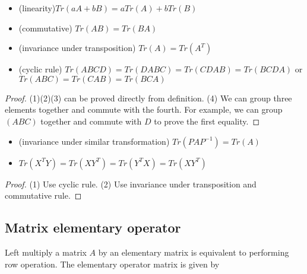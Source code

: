 \begin{refsection}
\begin{lemma}\label{appendix:th:matrixtraceproperty}\hfill
	\begin{itemize}
		\item (linearity)$Tr(aA + bB) = aTr(A) + bTr(B)$
		\item (commutative) $Tr(AB) = Tr(BA)$
		\item (invariance under transposition) $Tr(A) = Tr(A^T)$		
		\item (cyclic rule) $Tr(ABCD) = Tr(DABC)  = Tr(CDAB)= Tr(BCDA) $ or
		$Tr(ABC) = Tr(CAB) = Tr(BCA)$
	\end{itemize}
\end{lemma}
\begin{proof}
(1)(2)(3) can be proved directly from definition. (4) We can group three elements together and commute with the fourth. For example, we can group $(ABC)$ together and commute with $D$ to prove the first equality.
\end{proof}

\begin{corollary}\hfill
		\begin{itemize}
			\item (invariance under similar transformation) $Tr(PAP^{-1}) = Tr(A)$
			\item $Tr(X^TY)=Tr(XY^T) = Tr(Y^TX) = Tr(XY^T)$
		\end{itemize}
\end{corollary}
\begin{proof}
(1) Use cyclic rule. (2) Use invariance under transposition and commutative rule.
\end{proof}



\subsection{Matrix elementary operator}

\begin{lemma} Left multiply a matrix $A$ by an elementary matrix is equivalent to performing row operation. The elementary operator matrix is given by	
	

\end{lemma}
\end{refsection}
